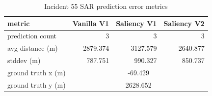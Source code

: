 \begin{table}[ht]
\centering
\caption{Incident 55 SAR prediction error metrics}
\label{tab:sar-incident-55}
\begin{tabular}{lrrr}
\hline
metric & Vanilla V1 & Saliency V1 & Saliency V2 \\
\hline
prediction count & 3 & 3 & 3 \\
avg distance (m) & 2879.374 & 3127.579 & 2640.877 \\
stddev (m) & 787.751 & 990.327 & 850.737 \\
ground truth x (m) & \multicolumn{3}{c}{-69.429} \\
ground truth y (m) & \multicolumn{3}{c}{2628.652} \\
\hline
\end{tabular}
\end{table}
